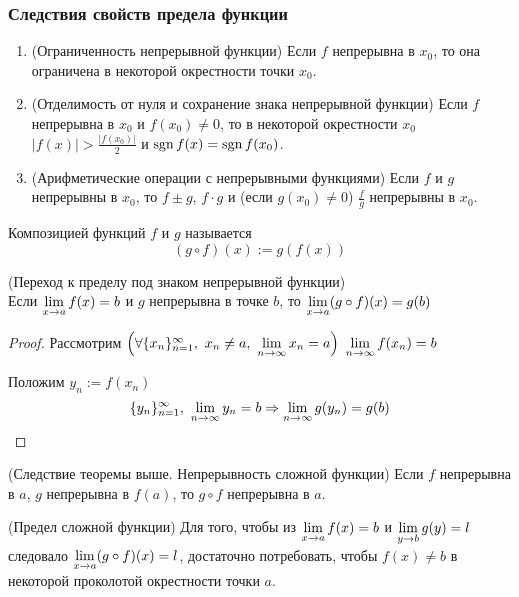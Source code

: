 \subsubsection*{Следствия свойств предела функции}

\begin{enumerate}
	\item (Ограниченность непрерывной функции) Если $f$ непрерывна в $x_0$, то она ограничена в некоторой окрестности точки $x_0$.
	
	\item (Отделимость от нуля и сохранение знака непрерывной функции) Если $f$ непрерывна в $x_0$ и $f(x_0) \neq 0$, то в некоторой окрестности $x_0$ $|f(x)| > \frac{|f(x_0)|}{2}$ и $\operatorname{sgn} f(x) = \operatorname{sgn} f(x_0)$.
	
	\item (Арифметические операции с непрерывными функциями) Если $f$ и $g$ непрерывны в $x_0$, то $f \pm g$, $f \cdot g$ и (если $g(x_0) \neq 0$) $\frac{f}{g}$ непрерывны в $x_0$.
\end{enumerate}

\begin{definition}
	Композицией функций $f$ и $g$ называется 
	$$
		(g \circ f)(x) := g(f(x))
	$$
\end{definition}

\begin{theorem} (Переход к пределу под знаком непрерывной функции) \\
	Если $\lim\limits_{x \to a} f(x) = b$ и $g$ непрерывна в точке $b$, то $\lim\limits_{x \to a} (g \circ f)(x) = g(b)$
\end{theorem}

\begin{proof}
	Рассмотрим $\left(\forall \{x_n\}_{n = 1}^\infty,\ x_n \neq a,\ \lim\limits_{n \to \infty} x_n = a\right)\ \lim\limits_{n \to \infty} f(x_n) = b$
	
	Положим $y_n := f(x_n)$
	$$
		\{y_n\}_{n = 1}^\infty,\ \lim\limits_{n \to \infty} y_n = b \Rightarrow \lim\limits_{n \to \infty} g(y_n) = g(b) 
	$$
\end{proof}

\begin{addition} (Следствие теоремы выше. Непрерывность сложной функции)
	Если $f$ непрерывна в $a$, $g$ непрерывна в $f(a)$, то $g \circ f$ непрерывна в $a$.
\end{addition}

\begin{note} (Предел сложной функции)
	Для того, чтобы из $\lim\limits_{x \to a} f(x) = b$ и $\lim\limits_{y \to b} g(y) = l$ следовало $\lim\limits_{x \to a} (g \circ f)(x) = l$, достаточно потребовать, чтобы $f(x) \neq b$ в некоторой проколотой окрестности точки $a$.
\end{note}

